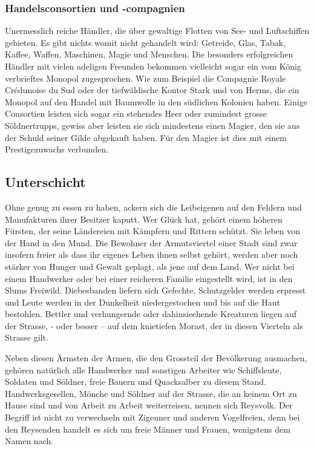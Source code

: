 \documentclass[12pt,twoside,twocolumn,openany]{book}
\begin{document}
\subsubsection{Handelsconsortien und -compagnien}
Unermesslich reiche Händler, die über gewaltige Flotten von See- und Luftschiffen gebieten. Es gibt nichts womit nicht gehandelt wird: Getreide, Glas, Tabak, Kaffee, Waffen, Maschinen, Magie und Menschen.
Die besonders erfolgreichen Händler mit vielen adeligen Freunden bekommen vielleicht sogar ein vom König verbrieftes Monopol zugesprochen. Wie zum Beispiel die Compagnie Royale Crédunoise du Sud oder der tiefwäldische Kontor Stark und von Herms, die ein  Monopol auf den Handel mit Baumwolle in den südlichen Kolonien haben.
Einige Consortien leisten sich sogar ein stehendes Heer oder zumindest grosse Söldnertrupps, gewiss aber leisten sie sich mindestens einen Magier, den sie aus der Schuld seiner Gilde abgekauft haben. Für den Magier ist dies mit einem Prestigezuwachs verbunden.


\subsection{Unterschicht}
Ohne genug zu essen zu haben, ackern sich die Leibeigenen auf den Feldern und Manufakturen ihrer Besitzer kaputt. Wer Glück hat, gehört einem höheren Fürsten, der seine Ländereien mit Kämpfern und Rittern schützt. Sie leben von der Hand in den Mund.
Die Bewohner der Armutsviertel einer Stadt sind zwar insofern freier als dass ihr eigenes Leben ihnen selbst gehört, werden aber noch stärker von Hunger und Gewalt geplagt, als jene auf dem Land. Wer nicht bei einem Handwerker oder bei einer reicheren Familie eingestellt wird, ist in den Slums Freiwild. Diebesbanden liefern sich Gefechte, Schutzgelder werden erpresst und Leute werden in der Dunkelheit niedergestochen und bis auf die Haut bestohlen. Bettler und verhungernde oder dahinsiechende Kreaturen liegen auf der Strasse, - oder besser – auf dem knietiefen Morast, der in diesen Vierteln als Strasse gilt.

Neben diesen Ärmsten der Armen, die den Grossteil der Bevölkerung ausmachen, gehören natürlich alle Handwerker und sonstigen Arbeiter wie Schiffsleute, Soldaten und Söldner, freie Bauern und Quacksalber zu diesem Stand. Handwerksgesellen, Mönche und Söldner auf der Strasse, die an keinem Ort zu Hause sind und von Arbeit zu Arbeit weiterreisen, nennen sich Reysvolk. Der Begriff ist nicht zu verwechseln mit Zigeuner und anderen Vogelfreien, denn bei den Reysenden handelt es sich um freie Männer und Frauen, wenigstens dem Namen nach.
\end{document}
